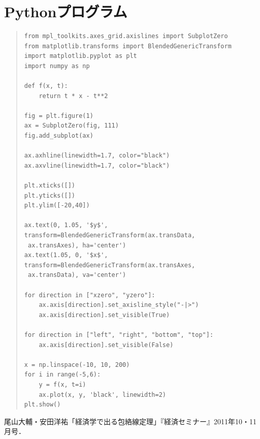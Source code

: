 \documentclass[11pt,a4j,fleqn]{jarticle}
\begin{document}
\section{Pythonプログラム}

\begin{quote}
\begin{verbatim}
from mpl_toolkits.axes_grid.axislines import SubplotZero
from matplotlib.transforms import BlendedGenericTransform
import matplotlib.pyplot as plt
import numpy as np

def f(x, t):
    return t * x - t**2

fig = plt.figure(1)
ax = SubplotZero(fig, 111)
fig.add_subplot(ax)

ax.axhline(linewidth=1.7, color="black")
ax.axvline(linewidth=1.7, color="black")

plt.xticks([])
plt.yticks([])
plt.ylim([-20,40])

ax.text(0, 1.05, '$y$', transform=BlendedGenericTransform(ax.transData,
 ax.transAxes), ha='center')
ax.text(1.05, 0, '$x$', transform=BlendedGenericTransform(ax.transAxes,
 ax.transData), va='center')

for direction in ["xzero", "yzero"]:
    ax.axis[direction].set_axisline_style("-|>")
    ax.axis[direction].set_visible(True)

for direction in ["left", "right", "bottom", "top"]:
    ax.axis[direction].set_visible(False)

x = np.linspace(-10, 10, 200)
for i in range(-5,6):
    y = f(x, t=i)
    ax.plot(x, y, 'black', linewidth=2)
plt.show()
\end{verbatim}
\end{quote}


\begin{thebibliography}{0}
尾山大輔・安田洋祐「経済学で出る包絡線定理」『経済セミナー』2011年10・11月号．
\end{thebibliography}
\end{document}
